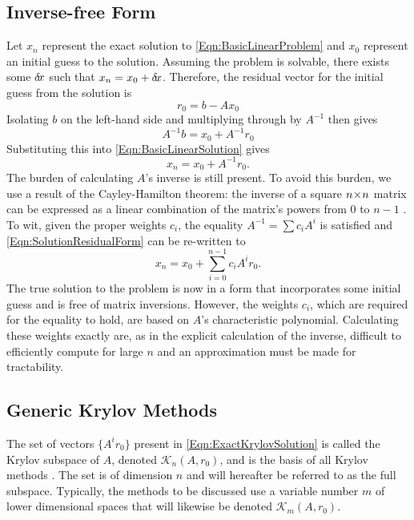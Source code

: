 \documentclass[12pt]{../UWMadThesis}
\begin{document}
\subsection{Inverse-free Form}
Let $x_n$ represent the exact solution to \cref{Eqn:BasicLinearProblem} and $x_0$ represent an initial guess to the solution.
Assuming the problem is solvable, there exists some $\delta \mkern-3.00mu x$ such that $x_n = x_0 + \delta \mkern-3.00mu x$.
Therefore, the residual vector for the initial guess from the solution is
\begin{equation}
    r_0 = b - A x_0
    \label{Eqn:InitialResidual}
\end{equation}
Isolating $b$ on the left-hand side and multiplying through by $A^{-1}$ then gives
\begin{equation}
    A^{-1} b = x_0 + A^{-1} r_0
\end{equation}
Substituting this into \cref{Eqn:BasicLinearSolution} gives
\begin{equation}
    x_n = x_0 + A^{-1} r_0.
    \label{Eqn:SolutionResidualForm}
\end{equation}
The burden of calculating $A$'s inverse is still present.
To avoid this burden, we use a result of the Cayley-Hamilton theorem: the inverse of a square $n \!\times\! n$ matrix can be expressed as a linear combination of the matrix's powers from $0$ to $n-1$ \cite{rao_mathematical_2009}.
To wit, given the proper weights $c_i$, the equality $A^{-1} = \sum c_i A^i$ is satisfied and \cref{Eqn:SolutionResidualForm} can be re-written to
\begin{equation}
    x_n = x_0 + \sum_{i = 0}^{n-1} c_i A^i r_0.
    \label{Eqn:ExactKrylovSolution}
\end{equation}
The true solution to the problem is now in a form that incorporates some initial guess and is free of matrix inversions.
However, the weights $c_i$, which are required for the equality to hold, are based on $A$'s characteristic polynomial.
Calculating these weights exactly are, as in the explicit calculation of the inverse, difficult to efficiently compute for large $n$ and an approximation must be made for tractability.


\subsection{Generic Krylov Methods}

The set of vectors $\{A^i r_0\}$ present in \cref{Eqn:ExactKrylovSolution} is called the Krylov subspace of $A$, denoted $\mathcal{K}_n(A,r_0)$, and is the basis of all Krylov methods \cite{saad_iterative_2003}.
The set is of dimension $n$ and will hereafter be referred to as the full subspace.
Typically, the methods to be discussed use a variable number $m$ of lower dimensional spaces that will likewise be denoted $\mathcal{K}_m(A,r_0)$.
\end{document}
